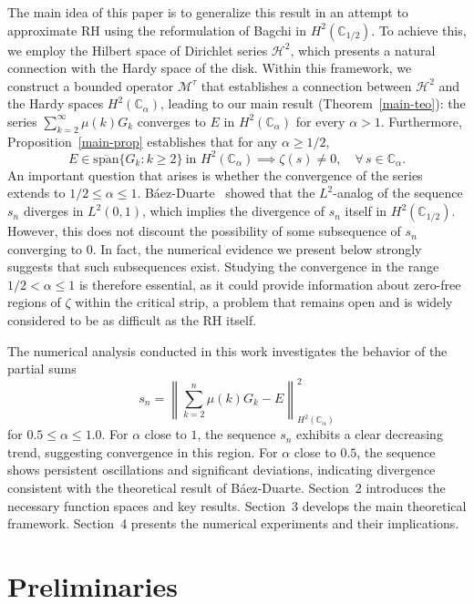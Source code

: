 \documentclass[11pt]{extarticle}
\numberwithin{equation}{section}
\theoremstyle{plain}
\theoremstyle{definition}
\begin{document}
The main idea of this paper is to generalize this 
result in an attempt to approximate RH using the reformulation of Bagchi in 
$H^2(\mathbb{C}_{1/2})$. To achieve this, we employ the Hilbert space of 
Dirichlet series $\mathcal{H}^2$, which presents a natural connection with 
the Hardy space of the disk. Within this framework, we construct a bounded 
operator $\mathcal{M}^\tau$ that establishes a connection between $\mathcal{H}^2$ 
and the Hardy spaces $H^2(\mathbb{C}_\alpha)$, leading to our main result 
(Theorem~\ref{main-teo}): the series $\sum_{k=2}^{\infty}\mu(k)G_k$ converges 
to $E$ in $H^2(\mathbb{C}_\alpha)$ for every $\alpha > 1$. Furthermore, 
Proposition~\ref{main-prop} establishes that for any $\alpha \geq 1/2$,
\[
E \in \overline{\mathrm{span}}\{G_k : k \geq 2\} \ \text{in } 
H^2(\mathbb{C}_\alpha) \implies \zeta(s) \neq 0, \quad \forall\, s \in \mathbb{C}_\alpha.
\]
An important question that arises is whether the convergence of the series 
extends to $1/2 \leq \alpha \leq 1$. Báez-Duarte~\cite{baez-unitary} showed 
that the $L^2$-analog of the sequence $s_n$ diverges in $L^2(0,1)$, which implies the divergence of $s_n$ itself
in $H^2(\mathbb{C}_{1/2})$. However, this does not discount the possibility of some subsequence of $s_n$ converging to $0$. In fact, the numerical evidence we present below strongly suggests that such subsequences exist. Studying the convergence in the range 
$1/2 < \alpha \leq 1$ is therefore essential, as it could provide information 
about zero-free regions of $\zeta$ within the critical strip, a problem that 
remains open and is widely considered to be as difficult as the RH itself.

The numerical analysis conducted in this work investigates the behavior of 
the partial sums
\[
s_n = \left\|\sum_{k=2}^{n}\mu(k)G_k - E\right\|^2_{H^2(\mathbb{C}_\alpha)}
\]
for $0.5 \leq \alpha \leq 1.0$. For $\alpha$ close to $1$, the sequence $s_n$ 
exhibits a clear decreasing trend, suggesting convergence in this region. 
For $\alpha$ close to $0.5$, the sequence shows persistent oscillations and 
significant deviations, indicating divergence consistent with the theoretical 
result of Báez-Duarte. Section~2 introduces the necessary function spaces and 
key results. Section~3 develops the main theoretical framework. Section~4 
presents the numerical experiments and their implications.

\section{Preliminaries}
\end{document}
